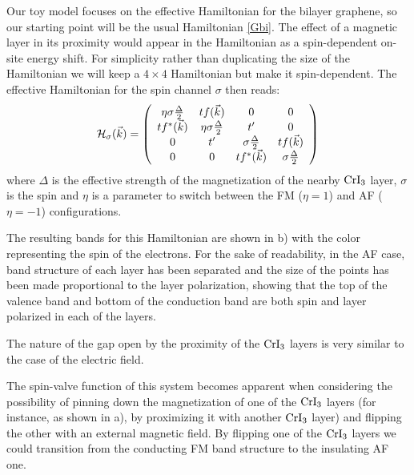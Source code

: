 Our toy model focuses on the effective Hamiltonian for the bilayer graphene, so our starting point will be the usual Hamiltonian \eqref{Gbi}. The effect of a magnetic layer in its proximity would appear in the Hamiltonian as a spin-dependent on-site energy shift.
For simplicity rather than duplicating the size of the Hamiltonian we will keep a $4\times4$ Hamiltonian but make it spin-dependent. The effective Hamiltonian for the spin channel $\sigma$ then reads:
\begin{eqnarray}
{\cal H}_{\sigma}(\vec{k})=\left(
\begin{array}{cccc}
\eta\sigma \frac{\Delta}{2} & tf(\vec{k}) & 0& 0 \\
tf^*(\vec{k}) & \eta\sigma \frac{\Delta}{2} & t' & 0 \\
0 & t'  &  \sigma \frac{\Delta}{2} &  tf(\vec{k})\\
 0 & 0 &  tf^*(\vec{k}) & \sigma \frac{\Delta}{2}
\end{array}
\right)
\label{hmodel}
\end{eqnarray}
where $\Delta$ is the effective strength of the magnetization of the nearby $\ce{CrI_3}$ layer, $\sigma$ is the spin and $\eta$ is a parameter to switch between the FM ($\eta=1$) and AF ($\eta=-1$) configurations.

The resulting bands for this Hamiltonian are shown in b) with the color representing the spin of the electrons. For the sake of readability, in the AF case, band structure of each layer has been separated and the size of the points has been made proportional to the layer polarization, showing that the top of the valence band and bottom of the conduction band are both spin and layer polarized in each of the layers.

The nature of the gap open by the proximity of the $\ce{CrI_3}$ layers is very similar to the case of the electric field.

The spin-valve function of this system becomes apparent when considering the possibility of pinning down the magnetization of one of the $\ce{CrI_3}$ layers (for instance, as shown in a), by proximizing it with another $\ce{CrI_3}$ layer) and flipping the other with an external magnetic field.
By flipping one of the $\ce{CrI_3}$ layers we could transition from the conducting FM band structure to the insulating AF one.



